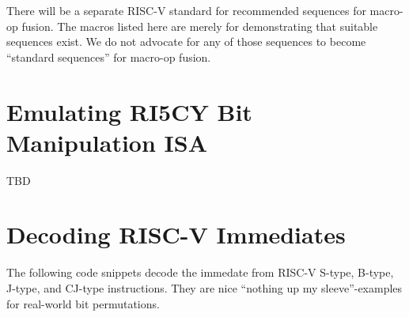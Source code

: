 There will be a separate RISC-V standard for recommended sequences for macro-op fusion.
The macros listed here are merely for demonstrating that suitable sequences exist. We
do not advocate for any of those sequences to become ``standard sequences'' for macro-op
fusion.

\section{Emulating RI5CY Bit Manipulation ISA}

TBD

\section{Decoding RISC-V Immediates}

The following code snippets decode the immedate from RISC-V S-type, B-type, J-type,
and CJ-type instructions. They are nice ``nothing up my sleeve''-examples for
real-world bit permutations.

